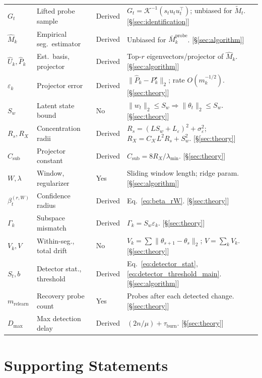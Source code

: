 \documentclass{article}
\begin{document}
\begin{longtable}{@{}p{} p{} p{} p{}@{}}
$G_t$ & Lifted probe sample & Derived & $G_t=\mathcal K^{-1}(s_tu_tu_t^\top)$; unbiased for $\widetilde M_t$. [\S\ref{sec:identification}] \\
$\widehat M_k$ & Empirical seg.\ estimator & Derived & Unbiased for $\bar M_k^{\mathrm{probe}}$. [\S\ref{sec:algorithm}] \\
$\widehat U_k, \widehat P_k$ & Est.\ basis, projector & Derived & Top-$r$ eigenvectors/projector of $\widehat M_k$. [\S\ref{sec:algorithm}] \\
$\varepsilon_k$ & Projector error & Derived & $\|\widehat P_k - P_k^\star\|_2$; rate $O(m_k^{-1/2})$. [\S\ref{sec:theory}] \\
$S_w$ & Latent state bound & No & $\|w_t\|_2 \le S_w \Rightarrow \|\theta_t\|_2 \le S_w$. [\S\ref{sec:theory}] \\
$R_s, R_X$ & Concentration radii & Derived & $R_s=(LS_w{+}L_\varepsilon)^2{+}\sigma_\varepsilon^2$; $R_X=C_{\mathcal K}L^2R_s{+}S_w^2$. [\S\ref{sec:theory}] \\
$C_{\mathrm{sub}}$ & Projector constant & Derived & $C_{\mathrm{sub}}=8R_X/\lambda_{\min}$. [\S\ref{sec:theory}] \\
$W, \lambda$ & Window, regularizer & Yes & Sliding window length; ridge param. [\S\ref{sec:algorithm}] \\
$\beta_t^{(r,W)}$ & Confidence radius & Derived & Eq.~\eqref{eq:beta_rW}. [\S\ref{sec:theory}] \\
$\Gamma_k$ & Subspace mismatch & Derived & $\Gamma_k = S_w \varepsilon_k$. [\S\ref{sec:theory}] \\
$V_k, V$ & Within-seg., total drift & No & $V_k = \sum \|\theta_{s+1}{-}\theta_s\|_2$; $V = \sum_k V_k$. [\S\ref{sec:theory}] \\
$S_t, b$ & Detector stat., threshold & Derived & Eq.~\eqref{eq:detector_stat}, \eqref{eq:detector_threshold_main}. [\S\ref{sec:algorithm}] \\
$m_{\mathrm{relearn}}$ & Recovery probe count & Yes & Probes after each detected change. [\S\ref{sec:theory}] \\
$D_{\max}$ & Max detection delay & Derived & $(2n/\mu)+\tau_{\mathrm{burn}}$. [\S\ref{sec:theory}] \\
\end{longtable}
\normalsize

\section{Supporting Statements}
\label{app:supporting_statements}
\end{document}
